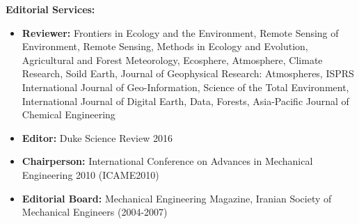 \documentclass[10pt]{article}
\newenvironment{changemargin}[2]{%
  \begin{list}{}{%
    \setlength{\topsep}{0pt}%
    \setlength{\leftmargin}{#1}%
    \setlength{\rightmargin}{#2}%
    \setlength{\listparindent}{\parindent}%
    \setlength{\itemindent}{\parindent}%
    \setlength{\parsep}{\parskip}%
  }%
  \item[]}{\end{list}
}
\newenvironment{body} {
	\vspace*{-2pt}
	\begin{changemargin}{-0.5in}{-0.5in}
  }
	{\end{changemargin}
}
\begin{document}
\begin{body}
  \textbf{Editorial Services:} \\
	\vspace*{-4pt}
			\begin{itemize} \itemsep -0pt
    	\item[] 	\textbf {Reviewer:} Frontiers in Ecology and the Environment, Remote Sensing of Environment, Remote Sensing, Methods in Ecology and Evolution, Agricultural and Forest Meteorology, Ecosphere, Atmosphere, Climate Research, Soild Earth, Journal of Geophysical Research: Atmospheres, ISPRS International Journal of Geo-Information, Science of the Total Environment, International Journal of Digital Earth, Data, Forests, Asia-Pacific Journal of Chemical Engineering\\
    	\item[] 	\textbf {Editor:} Duke Science Review 2016\\
    	\item[] 	\textbf {Chairperson:} International Conference on Advances in Mechanical Engineering 2010 (ICAME2010)\\
    	\item[] 	\textbf {Editorial Board:} Mechanical Engineering Magazine, Iranian Society of Mechanical Engineers (2004-2007)\\
	\end{itemize}


\end{body}
\end{document}
